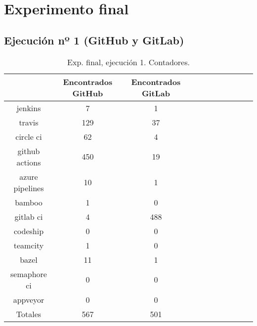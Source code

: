 \newpage

\section{Experimento final}

\subsection{Ejecución nº 1 (GitHub y GitLab)}

\begin{table}[h!]
  \centering
  \caption{Exp. final, ejecución 1. Contadores.}
  \label{tab:tabla_f1_1}

\begin{footnotesize}
\renewcommand{\arraystretch}{1.5} %
\begin{tabular}{ccccccccccc}
  \hline
  {} &  Encontrados GitHub &  Encontrados GitLab \\
  \hline
  jenkins         &                   7 &                   1 \\
  travis          &                 129 &                  37 \\
  circle ci       &                  62 &                   4 \\
  github actions  &                 450 &                  19 \\
  azure pipelines &                  10 &                   1 \\
  bamboo          &                   1 &                   0 \\
  gitlab ci       &                   4 &                 488 \\
  codeship        &                   0 &                   0 \\
  teamcity        &                   1 &                   0 \\
  bazel           &                  11 &                   1 \\
  semaphore ci    &                   0 &                   0 \\
  appveyor        &                   0 &                   0 \\
  \hline
  Totales         &                 567 &                 501 \\
 \end{tabular}
\end{footnotesize}

\end{table}

